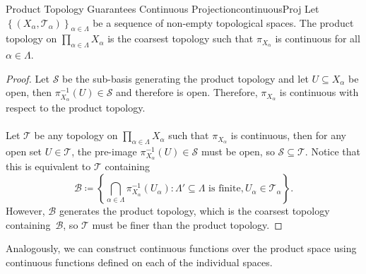 \documentclass[math]{amznotes}
\theoremstyle{remark}
\begin{document}
\begin{probox}{Product Topology Guarantees Continuous Projection}{continuousProj}
    Let $\left\{\left(X_{\alpha}, \mathcal{T}_{\alpha}\right)\right\}_{\alpha \in \Lambda}$ be a sequence of non-empty topological spaces. The product topology on $\prod_{\alpha \in \Lambda}X_{\alpha}$ is the coarsest topology such that $\pi_{X_{\alpha}}$ is continuous for all $\alpha \in \Lambda$.
    \tcblower
    \begin{proof}
        Let $\mathcal{S}$ be the sub-basis generating the product topology and let $U \subseteq X_{\alpha}$ be open, then $\pi^{-1}_{X_{\alpha}}\left(U\right) \in \mathcal{S}$ and therefore is open. Therefore, $\pi_{X_{\alpha}}$ is continuous with respect to the product topology.
        \\\\
        Let $\mathcal{T}$ be any topology on $\prod_{\alpha \in \Lambda}X_{\alpha}$ such that $\pi_{X_{\alpha}}$ is continuous, then for any open set $U \in \mathcal{T}$, the pre-image $\pi^{-1}_{X_{\alpha}}\left(U\right) \in \mathcal{S}$ must be open, so $\mathcal{S} \subseteq \mathcal{T}$. Notice that this is equivalent to $\mathcal{T}$ containing 
        \begin{equation*}
            \mathcal{B} \coloneqq \left\{\bigcap_{\alpha \in \Lambda}\pi^{-1}_{X_{\alpha}}\left(U_{\alpha}\right) \colon \Lambda' \subseteq \Lambda \textrm{ is finite}, U_{\alpha} \in \mathcal{T}_{\alpha}\right\}.
        \end{equation*}
        However, $\mathcal{B}$ generates the product topology, which is the coarsest topology containing~$\mathcal{B}$, so $\mathcal{T}$ must be finer than the product topology.
    \end{proof}
\end{probox}
Analogously, we can construct continuous functions over the product space using continuous functions defined on each of the individual spaces.
\end{document}
